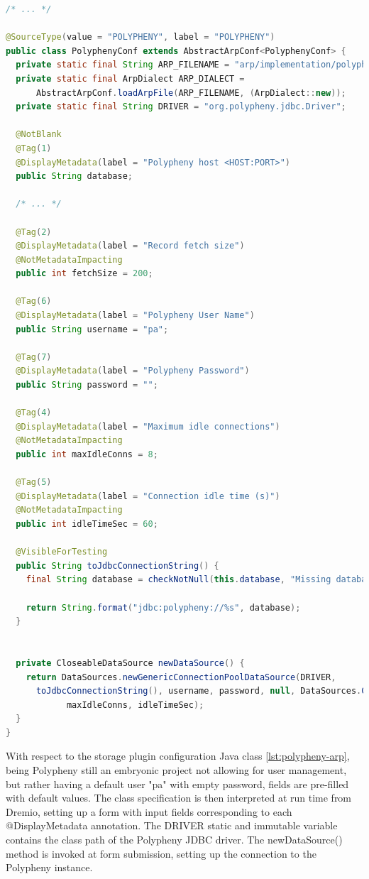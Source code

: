 \begin{lstlisting}[language=JAVA, caption={The storage plugin configuration file}, label={lst:polypheny-arp}]
/* ... */

@SourceType(value = "POLYPHENY", label = "POLYPHENY")
public class PolyphenyConf extends AbstractArpConf<PolyphenyConf> {
  private static final String ARP_FILENAME = "arp/implementation/polypheny-arp.yaml";
  private static final ArpDialect ARP_DIALECT =
      AbstractArpConf.loadArpFile(ARP_FILENAME, (ArpDialect::new));
  private static final String DRIVER = "org.polypheny.jdbc.Driver";

  @NotBlank
  @Tag(1)
  @DisplayMetadata(label = "Polypheny host <HOST:PORT>")
  public String database;

  /* ... */

  @Tag(2)
  @DisplayMetadata(label = "Record fetch size")
  @NotMetadataImpacting
  public int fetchSize = 200;

  @Tag(6)
  @DisplayMetadata(label = "Polypheny User Name")
  public String username = "pa";

  @Tag(7)
  @DisplayMetadata(label = "Polypheny Password")
  public String password = "";

  @Tag(4)
  @DisplayMetadata(label = "Maximum idle connections")
  @NotMetadataImpacting
  public int maxIdleConns = 8;

  @Tag(5)
  @DisplayMetadata(label = "Connection idle time (s)")
  @NotMetadataImpacting
  public int idleTimeSec = 60;

  @VisibleForTesting
  public String toJdbcConnectionString() {
    final String database = checkNotNull(this.database, "Missing database.");

    return String.format("jdbc:polypheny://%s", database);
  }


  private CloseableDataSource newDataSource() {
    return DataSources.newGenericConnectionPoolDataSource(DRIVER,
      toJdbcConnectionString(), username, password, null, DataSources.CommitMode.DRIVER_SPECIFIED_COMMIT_MODE,
            maxIdleConns, idleTimeSec);
  }
}
\end{lstlisting}

With respect to the storage plugin configuration Java class \ref{lst:polypheny-arp}, being Polypheny still an embryonic project not allowing for user management, but rather having a default user "pa" with empty password, fields are pre-filled with default values. The class specification is then interpreted at run time from Dremio, setting up a form with input fields corresponding to each @DisplayMetadata annotation.
The DRIVER static and immutable variable contains the class path of the Polypheny \ac{JDBC} driver. The newDataSource() method is invoked at form submission, setting up the connection to the Polypheny instance.

